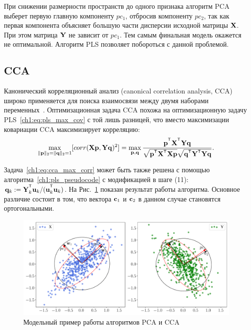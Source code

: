 При снижении размерности пространств до одного признака алгоритм PCA выберет первую главную компоненту $pc_1$, отбросив компоненту $pc_2$, так как первая компонента объясняет большую части дисперсии исходной матрицы $\mathbf{X}$. 
При этом матрица $\mathbf{Y}$ не зависит от $pc_1$. 
Тем самым финальная модель окажется не оптимальной.
Алгоритм PLS позволяет побороться с данной проблемой.

\subsection{CCA}

Канонический корреляционный анализ (canonical correlation analysis, CCA) широко применяется для поиска взаимосвязи между двумя наборами переменных~\cite{hotelling1992relations,anderson1962introduction}. 
Оптимизационная задача CCA похожа на оптимизационную задачу PLS~\eqref{ch1:eq:pls_max_cov} с той лишь разницей, что вместо максимизации ковариации CCA максимизирует корреляцию:
\begin{equation}
	\max_{\|\bp\|_{2}=\|\bq\|_{2}=1}[ corr(\bX \bp, \bY \bq)^{2}] = \max_{\bp, \bq} \frac{\bp^{\T} \bX^{\T} \bY \bq}{\sqrt{\bp^{\T} \bX^{\T}  \bX \bp} \sqrt{\bq^{\T} \bY^{\T}  \bY\bq}}.
	\label{ch1:eq:cca_max_corr}
\end{equation}

Задача~\eqref{ch1:eq:cca_max_corr} может быть также решена с помощью алгоритма~\ref{ch1:pls_pseudocode} с модификацией в шаге (11): $\bq_k := \bY_k^{\T}\bu_k/(\bu_k^{\T}\bu_k)$.
На Рис.~\ref{ch1:fig:cca_toy_example} показан результат работы алгоритма. Основное различие состоит в том, что вектора $\mathbf{c}_1$ и $\mathbf{c}_2$ в данном случае становятся ортогональными.

\begin{figure}[h]
	\centering
	\includegraphics[width=\linewidth]{figs/ch1/cca_toy_example}
	\caption{Модельный пример работы алгоритмов PCA и CCA}
	\label{ch1:fig:cca_toy_example}
\end{figure}

